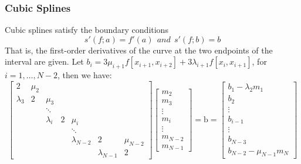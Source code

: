 \documentclass[a4paper]{article}
\begin{document}
\subsubsection{Cubic Splines}
Cubic splines satisfy the boundary conditions
\begin{equation}
    s'(f;a) = f'(a) \ \ and \ \ s'(f;b)=b
\end{equation}
That is, the first-order derivatives of the curve at the two endpoints of the interval are given.
Let $b_i =3\mu_{i+1} f[x_{i+1},x_{i+2}]+3\lambda_{i+1}f[x_{i},x_{i+1}]$, for $i=1,\dots,N-2$, then we have:
\begin{equation}
\begin{bmatrix}2&\mu_2\\\lambda_3&2&\mu_3\\&&\ddots\\&&\lambda_i&2&\mu_i\\&&&&\ddots\\&&&&\lambda_{N-2}&2&\mu_{N-2}\\&&&&&\lambda_{N-1}&2\end{bmatrix}\begin{bmatrix}m_2\\m_3\\\vdots\\m_i\\\vdots\\m_{N-2}\\m_{N-1}\end{bmatrix}=\mathrm{b} = \begin{bmatrix}
    b_1-\lambda_2m_1 \\
    b_2 \\
    \vdots\\
    b_{i-1}\\
    \vdots \\
     b_{N-3}\\ 
     b_{N-2} - \mu_{N-1}m_N
\end{bmatrix}
\end{equation}
\end{document}
